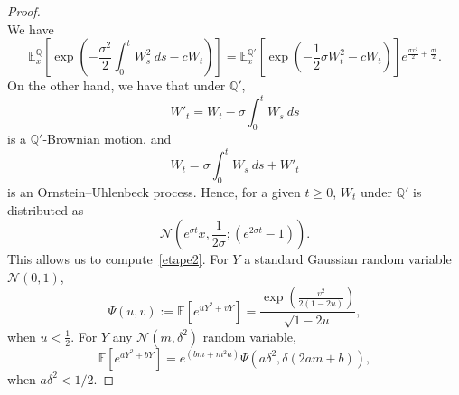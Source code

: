 \documentclass[10pt]{amsart}
\theoremstyle{definition}\newtheorem{defi}[theo]{Definition}\newtheorem{rema}[theo]{Remark}\newtheorem{exam}[theo]{Example}\newtheorem{exem}[theo]{Example}\newtheorem{nota}[theo]{Notation}
\providecommand{\No}{}
\renewcommand{\No}{\mathcal{N}}
\newcommand*\E{\mathbb{E}}
\newcommand{\bbQ}{\mathbb{Q}}
\begin{document}
\begin{proof}
\[\]
We have
\begin{equation}\label{etape2}
\E_{x}^{\bbQ}\left[\exp\left(-\frac{\sigma^2}{2}\int_{0}^{t} W_{s}^2\ ds -cW_{t}\right)\right]=\E_{x}^{\bbQ'}\left[\exp\left(-\frac{1}{2}\sigma W_{t}^2-c W_{t} \right) \right]e^{\frac{\sigma x^2}{2}+\frac{\sigma t}{2}}.
\end{equation}
On the other hand, we have that under $\bbQ'$,
\[
W'_t=W_{t}-\sigma\int_{0}^{t}W_{s}\ ds
\]
is a $\bbQ'$-Brownian motion, and
\[
W_{t}=\sigma\int_{0}^{t}W_{s}\ ds+W'_{t}
\]
is an Ornstein--Uhlenbeck process. Hence, for a given $t\geq 0$, $W_t$ under $\bbQ'$ is distributed as
\[
\No\left(e^{\sigma t}x,\frac{1}{2\sigma};\left(e^{2\sigma t}-1\right) \right).
\]
This allows us to compute~\eqref{etape2}. For $Y$ a standard Gaussian random variable $\No(0,1)$,
\[
\Psi(u,v):=\E\left[e^{uY^2+vY} \right] =\frac{\exp\left(\frac{v^2}{2(1-2u)} \right)}{\sqrt{1-2u}},
\]
when $u<\tfrac{1}{2}$. For $Y$ any $\No(m,\delta^2)$ random variable,
\[
\E\left[e^{aY^2+bY} \right]=e^{\left(bm+m^2a\right)}\Psi\left(a\delta^2,\delta(2am+b)\right),
\]
when $a \delta^2 <1/2$.




\end{proof}
\end{document}
